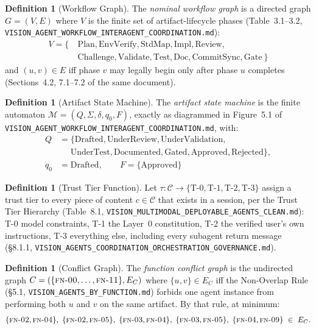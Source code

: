 \documentclass[12pt]{article}
\theoremstyle{definition}
\newtheorem{definition}[theorem]{Definition}
\newcommand{\code}[1]{\texttt{#1}}
\newcommand{\FN}[1]{\textsc{fn-#1}}
\newcommand{\VisionClean}{\code{VISION\_MULTIMODAL\_\allowbreak DEPLOYABLE\_\allowbreak AGENTS\_CLEAN.md}}
\newcommand{\VisionGov}{\code{VISION\_AGENTS\_\allowbreak COORDINATION\_\allowbreak ORCHESTRATION\_\allowbreak GOVERNANCE.md}}
\newcommand{\VisionFunc}{\code{VISION\_AGENTS\_\allowbreak BY\_FUNCTION.md}}
\newcommand{\VisionFlow}{\code{VISION\_AGENT\_\allowbreak WORKFLOW\_\allowbreak INTERAGENT\_\allowbreak COORDINATION.md}}
\begin{document}
\begin{definition}[Workflow Graph]
\label{def:workflow-graph}
The \emph{nominal workflow graph} is a directed graph
$G = (V, E)$ where $V$ is the finite set of artifact-lifecycle phases
(Table~3.1--3.2, \VisionFlow{}):
\begin{equation*}
  \begin{aligned}
    V = \{\ & \mathrm{Plan}, \mathrm{EnvVerify}, \mathrm{StdMap}, \mathrm{Impl}, \mathrm{Review}, \\
         & \mathrm{Challenge}, \mathrm{Validate}, \mathrm{Test}, \mathrm{Doc}, \mathrm{CommitSync}, \mathrm{Gate}\ \}
  \end{aligned}
\end{equation*}
and $(u,v) \in E$ iff phase $v$ may legally begin only after phase $u$
completes (Sections~4.2, 7.1--7.2 of the same document).
\end{definition}

\begin{definition}[Artifact State Machine]
\label{def:state-machine}
The \emph{artifact state machine} is the finite automaton
$\mathcal{M} = (Q, \Sigma, \delta, q_0, F)$, exactly as diagrammed in
Figure~5.1 of \VisionFlow{}, with:
\begin{equation*}
  \begin{aligned}
    Q &= \{\mathrm{Drafted}, \mathrm{UnderReview}, \mathrm{UnderValidation}, \\
      &\phantom{{}={}} \mathrm{UnderTest}, \mathrm{Documented}, \mathrm{Gated}, \mathrm{Approved}, \mathrm{Rejected}\}, \\
    q_0 &= \mathrm{Drafted}, \qquad F = \{\mathrm{Approved}\}
  \end{aligned}
\end{equation*}
\end{definition}

\begin{definition}[Trust Tier Function]
\label{def:trust}
Let $\tau : \mathcal{C} \to \{\mathrm{T\text{-}0}, \mathrm{T\text{-}1},
\mathrm{T\text{-}2}, \mathrm{T\text{-}3}\}$ assign a trust tier to every
piece of content $c \in \mathcal{C}$ that exists in a session, per the
Trust Tier Hierarchy (Table~8.1, \VisionClean{}): T-0 model constraints, T-1 the Layer~0
constitution, T-2 the verified user's own instructions, T-3 everything
else, including every subagent return message (\S8.1.1,
\VisionGov{}).
\end{definition}

\begin{definition}[Conflict Graph]
\label{def:conflict-graph}
The \emph{function conflict graph} is the undirected graph
$C = (\{\FN{00},\ldots,\FN{11}\}, E_C)$ where $\{u,v\} \in E_C$ iff the
Non-Overlap Rule (\S5.1, \VisionFunc{}) forbids
one agent instance from performing both $u$ and $v$ on the same artifact.
By that rule, at minimum:
\begin{equation*}
  \{\FN{02},\FN{04}\},\ \{\FN{02},\FN{05}\},\ \{\FN{03},\FN{04}\},\ \{\FN{03},\FN{05}\},\ \{\FN{04},\FN{09}\} \ \in\ E_C.
\end{equation*}
\end{definition}
\end{document}
